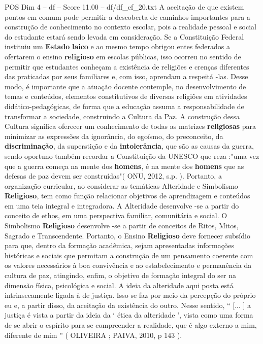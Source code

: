 \begin{textsample}{POS Dim 4 – df – Score 11.00 – df/df\_ef\_20.txt}
A aceitação de que existem pontos em comum pode permitir a descoberta de caminhos importantes para a construção de conhecimento no contexto escolar, pois a realidade pessoal e social do estudante estará sendo levada em consideração.
Se a Constituição Federal instituiu um \textbf{Estado} \textbf{laico} e ao mesmo tempo obrigou entes federados a ofertarem o ensino \textbf{religioso} em escolas públicas, isso ocorreu no sentido de permitir que estudantes conheçam a existência de religiões e crenças diferentes das praticadas por seus familiares e, com isso, aprendam a respeitá -las.
Desse modo, é importante que a atuação docente contemple, no desenvolvimento de temas e conteúdos, elementos constitutivos de diversas religiões em atividades didático-pedagógicas, de forma que a educação assuma a responsabilidade de transformar a sociedade, construindo a Cultura da Paz.
A construção dessa Cultura significa oferecer um conhecimento de todas as matrizes \textbf{religiosas} para minimizar as expressões da ignorância, do egoísmo, do preconceito, da \textbf{discriminação}, da superstição e da \textbf{intolerância}, que são as causas da guerra, sendo oportuno também recordar a Constituição da UNESCO que reza :"uma vez que a guerra começa na mente dos \textbf{homens}, é na mente dos \textbf{homens} que as defesas de paz devem ser construídas"( ONU, 2012, s.p. ).
Portanto, a organização curricular, ao considerar as temáticas Alteridade e Simbolismo \textbf{Religioso}, tem como função relacionar objetivos de aprendizagem e conteúdos em uma teia integral e integradora.
A Alteridade desenvolve -se a partir do conceito de ethos, em uma perspectiva familiar, comunitária e social.
O Simbolismo \textbf{Religioso} desenvolve -se a partir de conceitos de Ritos, Mitos, Sagrado e Transcendente.
Portanto, o Ensino \textbf{Religioso} deve fornecer subsídio para que, dentro da formação acadêmica, sejam apresentadas informações históricas e sociais que permitam a construção de um pensamento coerente com os valores necessários à boa convivência e ao estabelecimento e permanência da cultura de paz, atingindo, enfim, o objetivo de formação integral do ser na dimensão física, psicológica e social.
A ideia da alteridade aqui posta está intrinsecamente ligada à de justiça.
Isso se faz por meio da percepção do próprio eu e, a partir disso, da aceitação da existência do outro.
Nesse sentido, “ [... ] a justiça é vista a partir da ideia da ‘ ética da alteridade ’, vista como uma forma de se abrir o espírito para se compreender a realidade, que é algo externo a mim, diferente de mim ” ( OLIVEIRA ; PAIVA, 2010, p 143 ).

\end{textsample}
